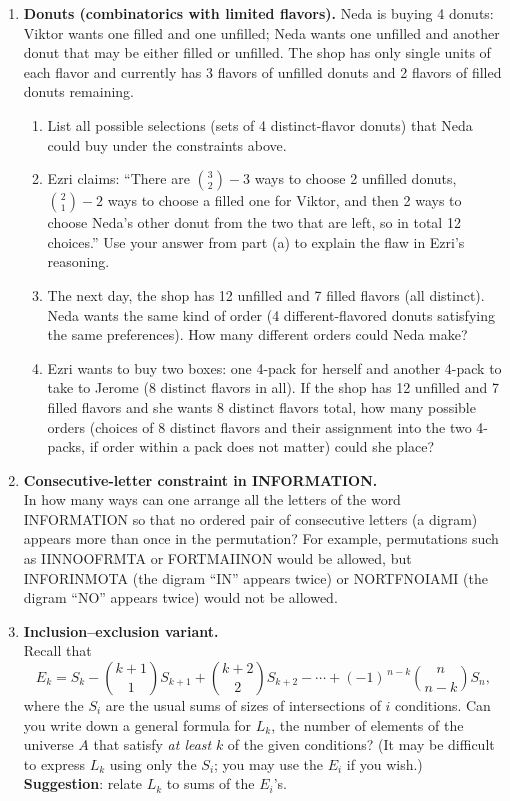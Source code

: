 \documentclass{article}
\theoremstyle{definition}
\begin{document}
\begin{enumerate}
\item \textbf{Donuts (combinatorics with limited flavors).}  
Neda is buying 4 donuts: Viktor wants one filled and one unfilled; 
Neda wants one unfilled and another donut that may be either 
filled or unfilled. The shop has only single units of each flavor 
and currently has 3 flavors of unfilled donuts and 2 flavors of 
filled donuts remaining.
\begin{enumerate}[label=(\alph*)]
  \item List all possible selections (sets of 4 distinct-flavor donuts) 
  that Neda could buy under the constraints above.
  \item Ezri claims: ``There are $ \binom{3}{2}-3 $ ways to choose 2 
  unfilled donuts, $ \binom{2}{1}-2 $ ways to choose a filled one for 
  Viktor, and then 2 ways to choose Neda's other donut from the two 
  that are left, so in total 12 choices.'' Use your answer from part 
  (a) to explain the flaw in Ezri's reasoning.
  \item The next day, the shop has 12 unfilled and 7 filled flavors 
  (all distinct). Neda wants the same kind of order (4 different-flavored 
  donuts satisfying the same preferences). How many different orders could 
  Neda make?
  \item Ezri wants to buy two boxes: one 4-pack for herself and another 
  4-pack to take to Jerome (8 distinct flavors in all). If the shop has 
  12 unfilled and 7 filled flavors and she wants 8 distinct flavors 
  total, how many possible orders (choices of 8 distinct flavors and 
  their assignment into the two 4-packs, if order within a pack does 
  not matter) could she place?
\end{enumerate}

\item \textbf{Consecutive-letter constraint in \textsc{INFORMATION}.} \\
In how many ways can one arrange all the letters of the word 
\textsf{INFORMATION} so that no ordered pair of consecutive letters 
(a digram) appears more than once in the permutation?  
For example, permutations such as \textsf{IINNOOFRMTA} or 
\textsf{FORTMAIINON} would be allowed, but \textsf{INFORINMOTA} 
(the digram ``IN'' appears twice) or \textsf{NORTFNOIAMI} (the 
digram ``NO'' appears twice) would not be allowed.

\item \textbf{Inclusion–exclusion variant.} \\
Recall that
\[
E_k = S_k - \binom{k+1}{1}S_{k+1} + \binom{k+2}{2}S_{k+2} - \cdots + (-1)^{\,n-k}\binom{n}{n-k}S_n,
\]
where the $S_i$ are the usual sums of sizes of intersections 
of $i$ conditions.  Can you write down a general formula for 
$L_k$, the number of elements of the universe $A$ that satisfy 
\emph{at least} $k$ of the given conditions?  (It may be 
difficult to express $L_k$ using only the $S_i$; you may 
use the $E_i$ if you wish.)\\
\textbf{Suggestion}: relate $L_k$ to sums of the $E_i$'s.




\end{enumerate}
\end{document}
